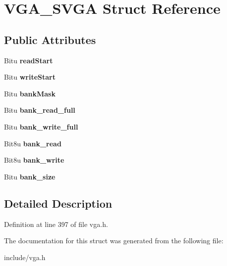 \hypertarget{structVGA__SVGA}{\section{V\-G\-A\-\_\-\-S\-V\-G\-A Struct Reference}
\label{structVGA__SVGA}
}
\subsection*{Public Attributes}
\begin{DoxyCompactItemize}
\item 
\hypertarget{structVGA__SVGA_a12feba28b67c048513e66e201fac71dc}{Bitu {\bfseries read\-Start}}\label{structVGA__SVGA_a12feba28b67c048513e66e201fac71dc}

\item 
\hypertarget{structVGA__SVGA_a6dd88ed646507e88dec8ea6f36168810}{Bitu {\bfseries write\-Start}}\label{structVGA__SVGA_a6dd88ed646507e88dec8ea6f36168810}

\item 
\hypertarget{structVGA__SVGA_ac754dc12435255d72973c78b3130f611}{Bitu {\bfseries bank\-Mask}}\label{structVGA__SVGA_ac754dc12435255d72973c78b3130f611}

\item 
\hypertarget{structVGA__SVGA_a709b930e64d2c6a7f97f2a707a8c6baa}{Bitu {\bfseries bank\-\_\-read\-\_\-full}}\label{structVGA__SVGA_a709b930e64d2c6a7f97f2a707a8c6baa}

\item 
\hypertarget{structVGA__SVGA_ab222686ed91393c5f22fcbc2683a9afb}{Bitu {\bfseries bank\-\_\-write\-\_\-full}}\label{structVGA__SVGA_ab222686ed91393c5f22fcbc2683a9afb}

\item 
\hypertarget{structVGA__SVGA_a97458414e7c3e11d66fe7a04442ee044}{Bit8u {\bfseries bank\-\_\-read}}\label{structVGA__SVGA_a97458414e7c3e11d66fe7a04442ee044}

\item 
\hypertarget{structVGA__SVGA_ad9e4750a5b4addc6f5b5bd332cec147f}{Bit8u {\bfseries bank\-\_\-write}}\label{structVGA__SVGA_ad9e4750a5b4addc6f5b5bd332cec147f}

\item 
\hypertarget{structVGA__SVGA_a3182c5e72fb68b0c125e9f350de5a2e3}{Bitu {\bfseries bank\-\_\-size}}\label{structVGA__SVGA_a3182c5e72fb68b0c125e9f350de5a2e3}

\end{DoxyCompactItemize}


\subsection{Detailed Description}


Definition at line 397 of file vga.\-h.



The documentation for this struct was generated from the following file\-:\begin{DoxyCompactItemize}
\item 
include/vga.\-h\end{DoxyCompactItemize}
